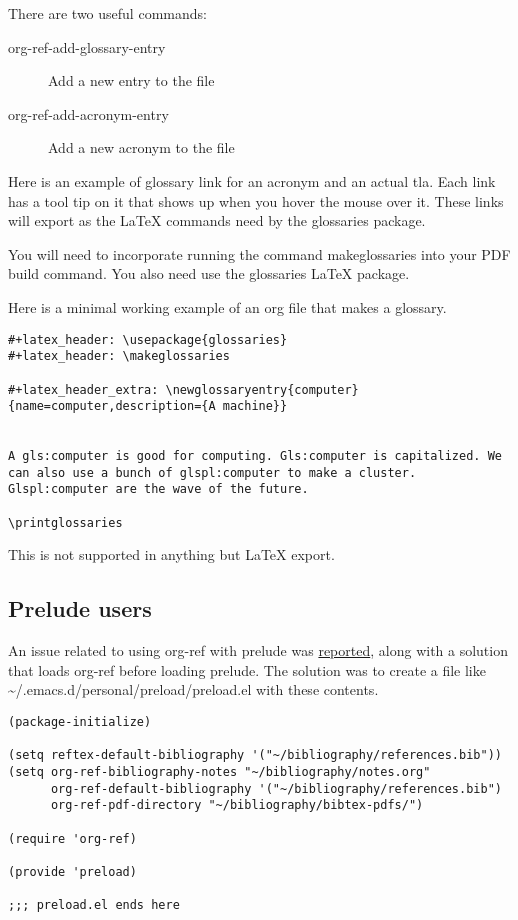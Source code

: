 \documentclass[11pt]{article}
\begin{document}
There are two useful commands:
\begin{description}
\item[{org-ref-add-glossary-entry}] Add a new entry to the file
\item[{org-ref-add-acronym-entry}] Add a new acronym to the file
\end{description}

Here is an example of glossary link for an \gls{acronym} and an actual \acrshort{tla}. Each link has a tool tip on it that shows up when you hover the mouse over it. These links will export as the \LaTeX{} commands need by the glossaries package.

You will need to incorporate running the command makeglossaries into your PDF build command. You also need use the glossaries \LaTeX{} package.

Here is a minimal working example of an org file that makes a glossary.

\begin{verbatim}
#+latex_header: \usepackage{glossaries}
#+latex_header: \makeglossaries

#+latex_header_extra: \newglossaryentry{computer}{name=computer,description={A machine}}


A gls:computer is good for computing. Gls:computer is capitalized. We can also use a bunch of glspl:computer to make a cluster. Glspl:computer are the wave of the future.

\printglossaries
\end{verbatim}

This is not supported in anything but \LaTeX{} export.

\glsaddall
\printglossaries

\subsection{Prelude users}
\label{sec:orgb4b2366}

An issue related to using org-ref with prelude was \href{https://github.com/jkitchin/org-ref/issues/583}{reported}, along with a solution that loads org-ref before loading prelude. The solution was to create a file like \textasciitilde{}/.emacs.d/personal/preload/preload.el with these contents.

\begin{verbatim}
(package-initialize)

(setq reftex-default-bibliography '("~/bibliography/references.bib"))
(setq org-ref-bibliography-notes "~/bibliography/notes.org"
      org-ref-default-bibliography '("~/bibliography/references.bib")
      org-ref-pdf-directory "~/bibliography/bibtex-pdfs/")

(require 'org-ref)

(provide 'preload)

;;; preload.el ends here
\end{verbatim}
\end{document}
